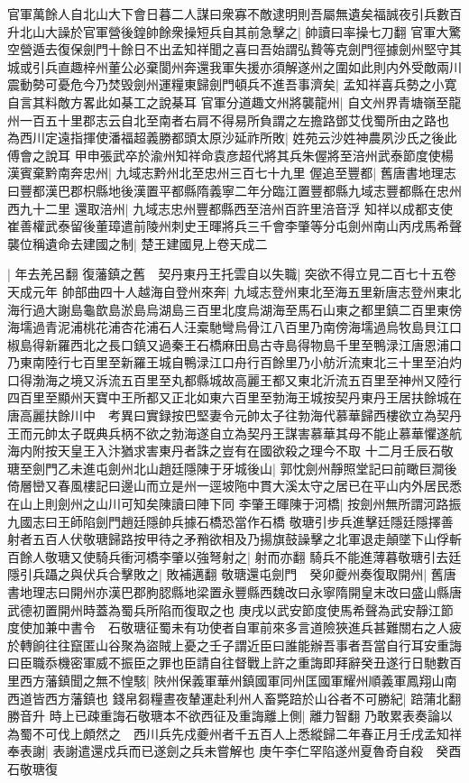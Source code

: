 官軍萬餘人自北山大下會日暮二人謀曰衆寡不敵逮明則吾屬無遺矣福誠夜引兵數百升北山大譟於官軍營後鍠帥餘衆操短兵自其前急擊之|{
	帥讀曰率操七刀翻}
官軍大驚空營遁去復保劍門十餘日不出孟知祥聞之喜曰吾始謂弘贄等克劍門徑據劍州堅守其城或引兵直趣梓州董公必棄閬州奔還我軍失援亦須解遂州之圍如此則内外受敵兩川震動勢可憂危今乃焚毁劍州運糧東歸劍門頓兵不進吾事濟矣|{
	孟知祥喜兵勢之小寛自言其料敵方畧此如棊工之說棊耳}
官軍分道趣文州將襲龍州|{
	自文州界青塘嶺至龍州一百五十里郡志云自北至南者右肩不得易所負謂之左擔路鄧艾伐蜀所由之路也}
為西川定遠指揮使潘福超義勝都頭太原沙延祚所敗|{
	姓苑云沙姓神農夙沙氏之後此傅會之說耳}
甲申張武卒於渝州知祥命袁彦超代將其兵朱偓將至涪州武泰節度使楊漢賓棄黔南奔忠州|{
	九域志黔州北至忠州三百七十九里}
偓追至豐都|{
	舊唐書地理志曰豐都漢巴郡枳縣地後漢置平都縣隋義寧二年分臨江置豐都縣九域志豐都縣在忠州西九十二里}
還取涪州|{
	九域志忠州豐都縣西至涪州百許里涪音浮}
知祥以成都支使崔善權武泰留後董璋遣前陵州刺史王暉將兵三千會李肇等分屯劍州南山丙戌馬希聲襲位稱遺命去建國之制|{
	楚王建國見上卷天成二}


|{
	年去羌呂翻}
復藩鎮之舊　契丹東丹王托雲自以失職|{
	突欲不得立見二百七十五卷天成元年}
帥部曲四十人越海自登州來奔|{
	九域志登州東北至海五里新唐志登州東北海行過大謝島龜歆島淤島烏湖島三百里北度烏湖海至馬石山東之都里鎮二百里東傍海壖過青泥浦桃花浦杏花浦石人汪槖馳彎烏骨江八百里乃南傍海壖過烏牧島貝江口椒島得新羅西北之長口鎮又過秦王石橋麻田島古寺島得物島千里至鴨渌江唐恩浦口乃東南陸行七百里至新羅王城自鴨渌江口舟行百餘里乃小舫沂流東北三十里至泊灼口得渤海之境又泝流五百里至丸都縣城故高麗王都又東北沂流五百里至神州又陸行四百里至顯州天寶中王所都又正北如東六百里至勃海王城按契丹東丹王居扶餘城在唐高麗扶餘川中　考異曰實録按巴堅妻令元帥太子往勃海代慕華歸西樓欲立為契丹王而元帥太子既典兵柄不欲之勃海遂自立為契丹王謀害慕華其母不能止慕華懼遂航海内附按天皇王入汴猶求害東丹者誅之豈有在國欲殺之理今不取}
十二月壬辰石敬瑭至劍門乙未進屯劍州北山趙廷隱陳于牙城後山|{
	郭忱劍州靜照堂記曰前瞰巨澗後倚層巒又春風樓記曰邊山而立是州一逕坡陁中貫大溪太守之居已在平山内外居民悉在山上則劍州之山川可知矣陳讀曰陣下同}
李肇王暉陳于河橋|{
	按劍州無所謂河路振九國志曰王師陷劍門趙廷隱帥兵據石橋恐當作石橋}
敬瑭引步兵進擊廷隱廷隱擇善射者五百人伏敬瑭歸路按甲待之矛矟欲相及乃揚旗鼓譟擊之北軍退走顛墜下山俘斬百餘人敬瑭又使騎兵衝河橋李肇以強弩射之|{
	射而亦翻}
騎兵不能進薄暮敬瑭引去廷隱引兵躡之與伏兵合擊敗之|{
	敗補邁翻}
敬瑭還屯劍門　癸卯夔州奏復取開州|{
	舊唐書地理志曰開州亦漢巴郡胊䏰縣地梁置永豐縣西魏改曰永寧隋開皇末改曰盛山縣唐武德初置開州時蓋為蜀兵所陷而復取之也}
庚戌以武安節度使馬希聲為武安靜江節度使加兼中書令　石敬瑭征蜀未有功使者自軍前來多言道險狹進兵甚難關右之人疲於轉餉往往竄匿山谷聚為盜賊上憂之壬子謂近臣曰誰能辦吾事者吾當自行耳安重誨曰臣職忝機密軍威不振臣之罪也臣請自往督戰上許之重誨即拜辭癸丑遂行日馳數百里西方藩鎮聞之無不惶駭|{
	陜州保義軍華州鎮國軍同州匡國軍耀州順義軍鳳翔山南西道皆西方藩鎮也}
錢帛芻糧晝夜輦運赴利州人畜斃踣於山谷者不可勝紀|{
	踣蒲北翻勝音升}
時上已疎重誨石敬瑭本不欲西征及重誨離上側|{
	離力智翻}
乃敢累表奏論以為蜀不可伐上頗然之　西川兵先戍夔州者千五百人上悉縱歸二年春正月壬戌孟知祥奉表謝|{
	表謝遣還戍兵而已遂劍之兵未嘗解也}
庚午李仁罕陷遂州夏魯奇自殺　癸酉石敬瑭復

